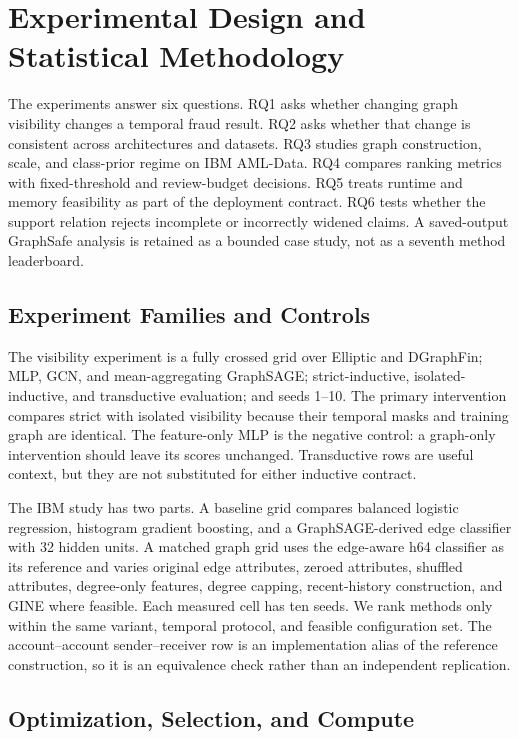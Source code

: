 \section{Experimental Design and Statistical Methodology}
\label{sec:experimental-design}

The experiments answer six questions. RQ1 asks whether changing graph visibility changes a temporal fraud result. RQ2 asks whether that change is consistent across architectures and datasets. RQ3 studies graph construction, scale, and class-prior regime on IBM AML-Data. RQ4 compares ranking metrics with fixed-threshold and review-budget decisions. RQ5 treats runtime and memory feasibility as part of the deployment contract. RQ6 tests whether the support relation rejects incomplete or incorrectly widened claims. A saved-output GraphSafe analysis is retained as a bounded case study, not as a seventh method leaderboard.

\subsection{Experiment Families and Controls}

The visibility experiment is a fully crossed grid over Elliptic and DGraphFin; MLP, GCN, and mean-aggregating GraphSAGE; strict-inductive, isolated-inductive, and transductive evaluation; and seeds 1--10. The primary intervention compares strict with isolated visibility because their temporal masks and training graph are identical. The feature-only MLP is the negative control: a graph-only intervention should leave its scores unchanged. Transductive rows are useful context, but they are not substituted for either inductive contract.

The IBM study has two parts. A baseline grid compares balanced logistic regression, histogram gradient boosting, and a GraphSAGE-derived edge classifier with 32 hidden units. A matched graph grid uses the edge-aware h64 classifier as its reference and varies original edge attributes, zeroed attributes, shuffled attributes, degree-only features, degree capping, recent-history construction, and GINE where feasible. Each measured cell has ten seeds. We rank methods only within the same variant, temporal protocol, and feasible configuration set. The account--account sender--receiver row is an implementation alias of the reference construction, so it is an equivalence check rather than an independent replication.

\subsection{Optimization, Selection, and Compute}

